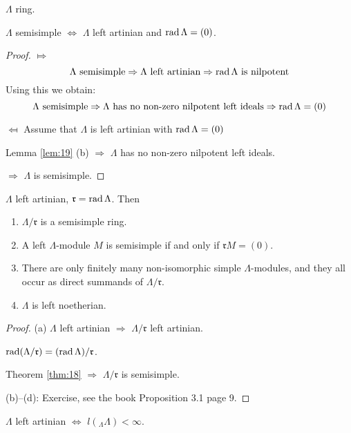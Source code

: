 \begin{thm}\label{thm:20}
$\Lambda$ ring.

$\Lambda$ semisimple $\Leftrightarrow$ $\Lambda$ left artinian and
$\operatorname{rad}\nolimits\Lambda = (0)$. 
\end{thm}
\begin{proof}
$\Mapsto$ 
\[\Lambda \textrm{\ semisimple} \Rightarrow \Lambda \textrm{\ left
  artinian}\Rightarrow \operatorname{rad}\nolimits\Lambda \textrm{\ is nilpotent}\]
Using this we obtain:
\[\Lambda \textrm{\ semisimple} \Rightarrow \Lambda \textrm{\ has no non-zero nilpotent left ideals} 
\Rightarrow \rad\Lambda = (0)\]

$\Mapsfrom$ Assume that $\Lambda$ is left artinian with $\operatorname{rad}\nolimits\Lambda =
(0)$

Lemma \ref{lem:19} (b) $\Rightarrow$ $\Lambda$ has no non-zero nilpotent
left ideals.

$\Rightarrow$ $\Lambda$ is semisimple.
\end{proof}

\begin{thm}\label{thm:21}
$\Lambda$ left artinian, $\mathfrak{r} = \operatorname{rad}\nolimits\Lambda$.
Then
\begin{enumerate}[\rm(a)]
\item $\Lambda/\mathfrak{r}$ is a semisimple ring. 
\item A left $\Lambda$-module $M$ is semisimple if and only if
  $\mathfrak{r}M=(0)$. 
\item There are only finitely many non-isomorphic simple
  $\Lambda$-modules, and they all occur as direct summands of
  $\Lambda/\mathfrak{r}$. 
\item $\Lambda$ is left noetherian.
\end{enumerate}
\end{thm}
\begin{proof}
(a) $\Lambda$ left artinian $\Rightarrow$ $\Lambda/\mathfrak{r}$ left
artinian.

$\operatorname{rad}\nolimits(\Lambda/\mathfrak{r}) = (\operatorname{rad}\nolimits\Lambda)/\mathfrak{r}$.

Theorem \ref{thm:18} $\Rightarrow$ $\Lambda/\mathfrak{r}$
is semisimple. 

(b)--(d):  Exercise, see the book Proposition 3.1 page 9. 
\end{proof}

\begin{recall}
$\Lambda$ left artinian $\Leftrightarrow$ $l(_\Lambda\Lambda) <
\infty$. 
\end{recall}

